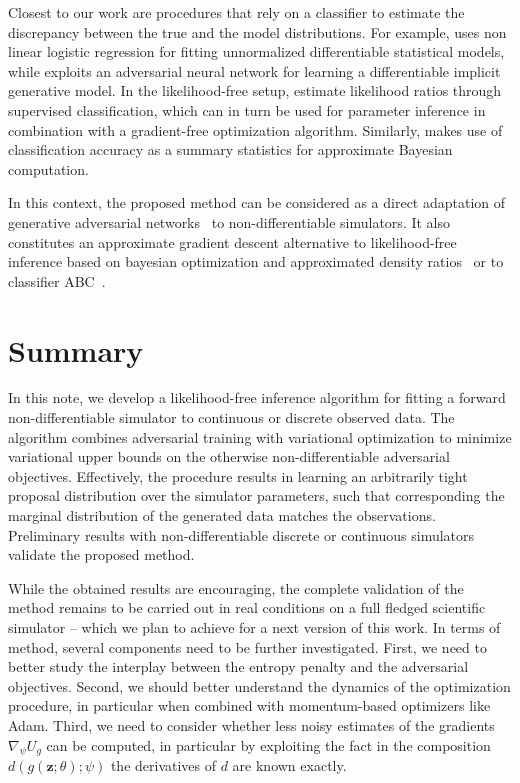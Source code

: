 \documentclass[twocolumn,superscriptaddress,aps]{revtex4-1}
\theoremstyle{plain}
\begin{document}
Closest to our work are procedures that rely on a classifier to estimate the
discrepancy between the true and the model distributions. For example,
\citep{gutmann2012noise} uses non linear logistic regression for fitting
unnormalized differentiable statistical models, while
\citep{goodfellow2014generative} exploits an adversarial neural network for
learning a differentiable implicit generative model. In the likelihood-free
setup, \citep{cranmer2015approximating,cranmer2016experiments,2016arXiv161110242D} estimate likelihood
ratios through supervised classification, which can in turn be used for
parameter inference in combination with a gradient-free optimization algorithm.
Similarly, \citep{gutmann2017likelihood} makes use of classification accuracy as
a summary statistics for approximate Bayesian computation.

In this context, the proposed method can be considered as a direct adaptation of
generative adversarial networks~\citep{goodfellow2014generative} to
non-differentiable simulators. It also constitutes an approximate gradient
descent alternative to likelihood-free inference based on bayesian optimization and approximated density
ratios~\citep{cranmer2015approximating,cranmer2016experiments} or to classifier
ABC~\citep{gutmann2017likelihood}.



\section{Summary}

In this note, we develop a likelihood-free inference algorithm for fitting a
forward non-differentiable simulator to continuous or discrete observed data.
The algorithm combines adversarial training  with variational optimization to
minimize variational upper bounds  on the otherwise non-differentiable
adversarial objectives.
Effectively, the procedure results in learning an arbitrarily tight proposal
distribution over the simulator parameters, such that corresponding the marginal
distribution of the generated data matches the observations. Preliminary results
with non-differentiable discrete or continuous simulators validate the proposed method.

While the obtained results are encouraging, the complete validation of the
method remains to be carried out in real conditions on a full fledged scientific
simulator -- which we plan to achieve for a next version of this work.
In terms of method, several components need to be further investigated.
First, we need to better study the interplay between the entropy penalty and the adversarial objectives.
Second, we should better understand the dynamics of the optimization
procedure, in particular when combined with momentum-based optimizers like Adam.
Third, we need to consider whether less noisy estimates of the gradients
$\nabla_\psi U_g$ can be computed, in particular by exploiting the fact in the composition $d(g(\mathbf{z};\theta); \psi)$
the derivatives of $d$ are known exactly.
\end{document}
